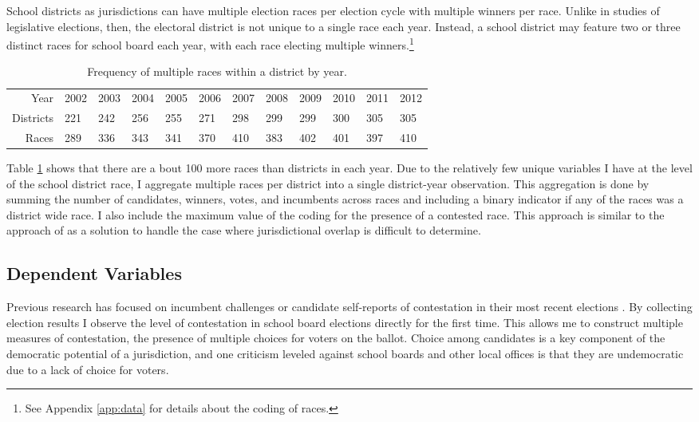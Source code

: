 School districts as jurisdictions can have multiple election races per election 
cycle with multiple winners per race. Unlike in studies of legislative elections, 
then, the electoral district is not unique to a single race each year. Instead, 
a school district may feature two or three distinct races for school board each year, 
with each race electing multiple winners.\footnote{See Appendix \ref{app:data} for 
details about the coding of races.}

\begin{table}[ht]
\centering
\begin{tabular}{rlllllllllll}
  \hline
  \hline
Year & 2002 & 2003 & 2004 & 2005 & 2006 & 2007 & 2008 & 2009 & 2010 & 2011 & 2012 \\ 
  Districts & 221 & 242 & 256 & 255 & 271 & 298 & 299 & 299 & 300 & 305 & 305 \\ 
  Races & 289 & 336 & 343 & 341 & 370 & 410 & 383 & 402 & 401 & 397 & 410 \\ 
   \hline
\end{tabular}
\caption{Frequency of multiple races within a district by year.} 
\label{tab:mrfreq}
\end{table}


Table \ref{tab:mrfreq} shows that there are a bout 100 more races than districts 
in each year. Due to the relatively few unique variables I have at the level of the school 
district race, I aggregate multiple races per district into a single district-year 
observation. This aggregation is done by summing the number of candidates, winners, 
votes, and incumbents across races and including a binary indicator if any of the 
races was a district wide race. I also include the maximum value of the coding for 
the presence of a contested race. This approach is similar to the approach of 
\citet{berry2} as a solution to handle the case where jurisdictional overlap is 
difficult to determine. 

\clearpage
\subsection{Dependent Variables}

Previous research has focused on incumbent challenges or candidate self-reports of 
contestation in their most recent elections \citep{RefWorks:311, RefWorks:321}. 
By collecting election results I observe the level of contestation 
in school board elections directly for the first time. This allows me to construct 
multiple measures of contestation, the presence of multiple choices for voters on 
the ballot. Choice among candidates is a key component of the democratic potential 
of a jurisdiction, and one criticism leveled against school boards and other local 
offices is that they are undemocratic due to a lack of choice for voters. 

